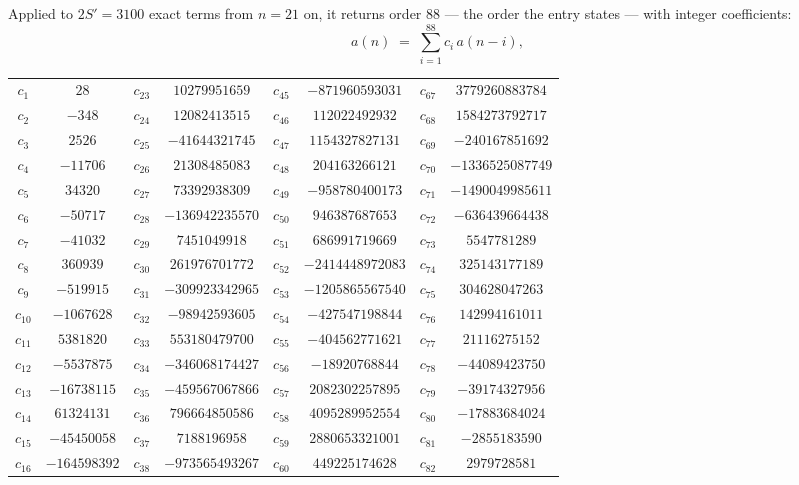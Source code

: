 \documentclass[11pt,a4paper]{article}
\theoremstyle{plain}
\theoremstyle{definition}
\begin{document}
Applied to $2S'=3100$ exact terms from $n=21$ on, it returns order $88$ --- the
order the entry states --- with integer coefficients:
\[
a(n)\;=\;\sum_{i=1}^{88}c_i\,a(n-i),
\]
\begin{center}\small
\begin{tabular}{cccccccc}
$c_{1}$ & $28$ & $c_{23}$ & $10279951659$ & $c_{45}$ & $-871960593031$ & $c_{67}$ & $3779260883784$ \\
$c_{2}$ & $-348$ & $c_{24}$ & $12082413515$ & $c_{46}$ & $112022492932$ & $c_{68}$ & $1584273792717$ \\
$c_{3}$ & $2526$ & $c_{25}$ & $-41644321745$ & $c_{47}$ & $1154327827131$ & $c_{69}$ & $-240167851692$ \\
$c_{4}$ & $-11706$ & $c_{26}$ & $21308485083$ & $c_{48}$ & $204163266121$ & $c_{70}$ & $-1336525087749$ \\
$c_{5}$ & $34320$ & $c_{27}$ & $73392938309$ & $c_{49}$ & $-958780400173$ & $c_{71}$ & $-1490049985611$ \\
$c_{6}$ & $-50717$ & $c_{28}$ & $-136942235570$ & $c_{50}$ & $946387687653$ & $c_{72}$ & $-636439664438$ \\
$c_{7}$ & $-41032$ & $c_{29}$ & $7451049918$ & $c_{51}$ & $686991719669$ & $c_{73}$ & $5547781289$ \\
$c_{8}$ & $360939$ & $c_{30}$ & $261976701772$ & $c_{52}$ & $-2414448972083$ & $c_{74}$ & $325143177189$ \\
$c_{9}$ & $-519915$ & $c_{31}$ & $-309923342965$ & $c_{53}$ & $-1205865567540$ & $c_{75}$ & $304628047263$ \\
$c_{10}$ & $-1067628$ & $c_{32}$ & $-98942593605$ & $c_{54}$ & $-427547198844$ & $c_{76}$ & $142994161011$ \\
$c_{11}$ & $5381820$ & $c_{33}$ & $553180479700$ & $c_{55}$ & $-404562771621$ & $c_{77}$ & $21116275152$ \\
$c_{12}$ & $-5537875$ & $c_{34}$ & $-346068174427$ & $c_{56}$ & $-18920768844$ & $c_{78}$ & $-44089423750$ \\
$c_{13}$ & $-16738115$ & $c_{35}$ & $-459567067866$ & $c_{57}$ & $2082302257895$ & $c_{79}$ & $-39174327956$ \\
$c_{14}$ & $61324131$ & $c_{36}$ & $796664850586$ & $c_{58}$ & $4095289952554$ & $c_{80}$ & $-17883684024$ \\
$c_{15}$ & $-45450058$ & $c_{37}$ & $7188196958$ & $c_{59}$ & $2880653321001$ & $c_{81}$ & $-2855183590$ \\
$c_{16}$ & $-164598392$ & $c_{38}$ & $-973565493267$ & $c_{60}$ & $449225174628$ & $c_{82}$ & $2979728581$ \\

\end{tabular}
\end{center}
\end{document}
